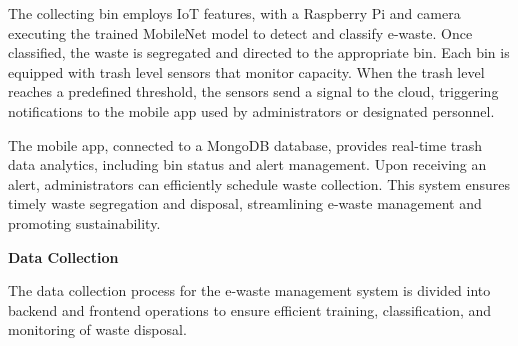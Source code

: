 The collecting bin employs IoT features, with a Raspberry Pi and camera executing the trained MobileNet model to detect and classify e-waste. Once classified, the waste is segregated and directed to the appropriate bin. Each bin is equipped with trash level sensors that monitor capacity. When the trash level reaches a predefined threshold, the sensors send a signal to the cloud, triggering notifications to the mobile app used by administrators or designated personnel.

The mobile app, connected to a MongoDB database, provides real-time trash data analytics, including bin status and alert management. Upon receiving an alert, administrators can efficiently schedule waste collection. This system ensures timely waste segregation and disposal, streamlining e-waste management and promoting sustainability. 

\textbf{Data Collection}

The data collection process for the e-waste management system is divided into backend and frontend operations to ensure efficient training, classification, and monitoring of waste disposal. 

